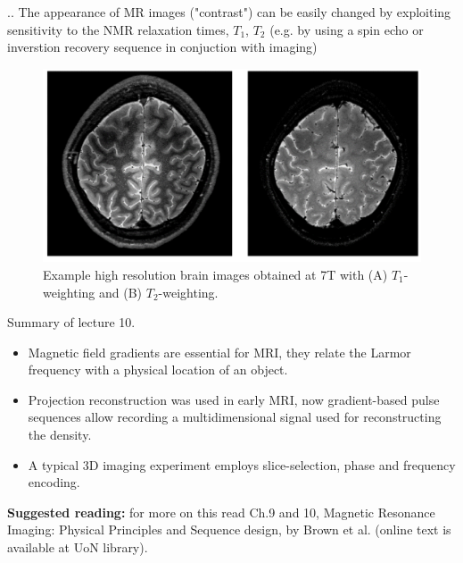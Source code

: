 \documentclass[handout]{beamer}
\begin{document}
\begin{frame}{\thesection.\thesubsection. \insertsubsection}
   The appearance of MR images ("contrast") can be easily changed by exploiting sensitivity to the NMR relaxation times, $T_1$, $T_2$ (e.g. by using a spin echo or inverstion recovery sequence in conjuction with imaging)
    \begin{figure}
   	\centering
   	\includegraphics[scale=0.4]{figures/slice_selection3.png}
   	\caption{Example high resolution brain images obtained at 7T with (A) $T_1$-weighting and (B) $T_2$-weighting.}
   \end{figure} 
   
\end{frame}

\begin{frame}{Summary of lecture 10.}
  \begin{itemize}
  	\item Magnetic field gradients are essential for MRI, they relate the Larmor frequency with a physical location of an object.
  	\item Projection reconstruction was used in early MRI, now gradient-based pulse sequences allow recording a multidimensional signal used for reconstructing the density.
  	\item A typical 3D imaging experiment employs slice-selection, phase and frequency encoding.
  \end{itemize}
   \textbf{Suggested reading:} for more on this read Ch.9 and 10, Magnetic Resonance Imaging: Physical Principles and Sequence design, by Brown et al. (online text is available at UoN library).

\end{frame}
\end{document}

